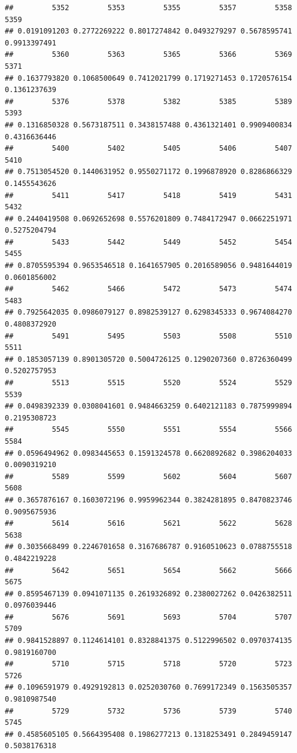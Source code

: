 \documentclass[
]{article}
\begin{document}
\begin{verbatim}
##         5352         5353         5355         5357         5358         5359 
## 0.0191091203 0.2772269222 0.8017274842 0.0493279297 0.5678595741 0.9913397491 
##         5360         5363         5365         5366         5369         5371 
## 0.1637793820 0.1068500649 0.7412021799 0.1719271453 0.1720576154 0.1361237639 
##         5376         5378         5382         5385         5389         5393 
## 0.1316850328 0.5673187511 0.3438157488 0.4361321401 0.9909400834 0.4316636446 
##         5400         5402         5405         5406         5407         5410 
## 0.7513054520 0.1440631952 0.9550271172 0.1996878920 0.8286866329 0.1455543626 
##         5411         5417         5418         5419         5431         5432 
## 0.2440419508 0.0692652698 0.5576201809 0.7484172947 0.0662251971 0.5275204794 
##         5433         5442         5449         5452         5454         5455 
## 0.8705595394 0.9653546518 0.1641657905 0.2016589056 0.9481644019 0.0601856002 
##         5462         5466         5472         5473         5474         5483 
## 0.7925642035 0.0986079127 0.8982539127 0.6298345333 0.9674084270 0.4808372920 
##         5491         5495         5503         5508         5510         5511 
## 0.1853057139 0.8901305720 0.5004726125 0.1290207360 0.8726360499 0.5202757953 
##         5513         5515         5520         5524         5529         5539 
## 0.0498392339 0.0308041601 0.9484663259 0.6402121183 0.7875999894 0.2195308723 
##         5545         5550         5551         5554         5566         5584 
## 0.0596494962 0.0983445653 0.1591324578 0.6620892682 0.3986204033 0.0090319210 
##         5589         5599         5602         5604         5607         5608 
## 0.3657876167 0.1603072196 0.9959962344 0.3824281895 0.8470823746 0.9095675936 
##         5614         5616         5621         5622         5628         5638 
## 0.3035668499 0.2246701658 0.3167686787 0.9160510623 0.0788755518 0.4842219228 
##         5642         5651         5654         5662         5666         5675 
## 0.8595467139 0.0941071135 0.2619326892 0.2380027262 0.0426382511 0.0976039446 
##         5676         5691         5693         5704         5707         5709 
## 0.9841528897 0.1124614101 0.8328841375 0.5122996502 0.0970374135 0.9819160700 
##         5710         5715         5718         5720         5723         5726 
## 0.1096591979 0.4929192813 0.0252030760 0.7699172349 0.1563505357 0.9810987540 
##         5729         5732         5736         5739         5740         5745 
## 0.4585605105 0.5664395408 0.1986277213 0.1318253491 0.2849459147 0.5038176318 

\end{verbatim}
\end{document}
